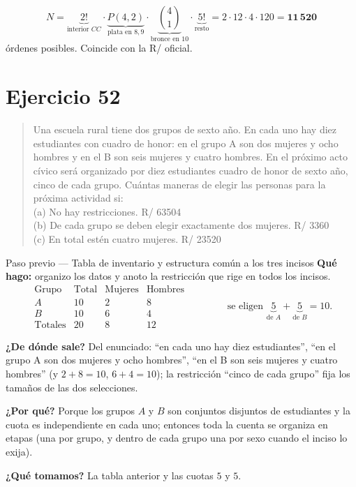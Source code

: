 \documentclass[11pt]{article}
\begin{document}
\begin{resp}
\[
N=\underbrace{2!}_{\text{interior }CC}\cdot\underbrace{P(4,2)}_{\text{plata en }8,9}\cdot\underbrace{\binom{4}{1}}_{\text{bronce en }10}\cdot\underbrace{5!}_{\text{resto}}=2\cdot 12\cdot 4\cdot 120=\mathbf{11\,520}
\]
\'ordenes posibles. Coincide con la R/ oficial.
\end{resp}

\section*{Ejercicio 52}

\begin{quote}
Una escuela rural tiene dos grupos de sexto a\~no. En cada uno hay diez estudiantes con cuadro de honor: en
el grupo A son dos mujeres y ocho hombres y en el B son seis mujeres y cuatro hombres. En el pr\'oximo acto
c\'ivico ser\'a organizado por diez estudiantes cuadro de honor de sexto a\~no, cinco de cada grupo.
Cu\'antas maneras de elegir las personas para la pr\'oxima actividad si:\\
(a) No hay restricciones. \hfill R/ 63504\\
(b) De cada grupo se deben elegir exactamente dos mujeres. \hfill R/ 3360\\
(c) En total est\'en cuatro mujeres. \hfill R/ 23520
\end{quote}

\begin{paso}{Paso previo --- Tabla de inventario y estructura com\'un a los tres incisos}
\textbf{Qu\'e hago:} organizo los datos y anoto la restricci\'on que rige en todos los incisos.
\[
\begin{array}{l|c|c|c}
\text{Grupo} & \text{Total} & \text{Mujeres} & \text{Hombres}\\ \hline
A & 10 & 2 & 8\\
B & 10 & 6 & 4\\ \hline
\text{Totales} & 20 & 8 & 12
\end{array}
\qquad\qquad
\text{se eligen } \underbrace{5}_{\text{de }A}+\underbrace{5}_{\text{de }B}=10 .
\]

\textbf{¿De d\'onde sale?} Del enunciado: ``en cada uno hay diez estudiantes'', ``en el grupo A son dos
mujeres y ocho hombres'', ``en el B son seis mujeres y cuatro hombres'' (y $2+8=10$, $6+4=10$); la
restricci\'on ``cinco de cada grupo'' fija los tama\~nos de las dos selecciones.

\textbf{¿Por qu\'e?} Porque los grupos $A$ y $B$ son conjuntos disjuntos de estudiantes y la cuota es
independiente en cada uno; entonces toda la cuenta se organiza en etapas (una por grupo, y dentro de cada
grupo una por sexo cuando el inciso lo exija).

\textbf{¿Qu\'e tomamos?} La tabla anterior y las cuotas $5$ y $5$.
\end{paso}
\end{document}
